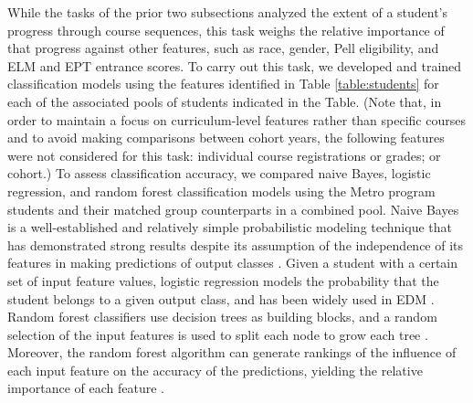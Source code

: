 \documentclass[conference]{IEEEtran}
\begin{document}
While the tasks of the prior two subsections analyzed the extent of a student's progress through course sequences, this task weighs the relative importance of that progress against other features, such as race, gender, Pell eligibility, and ELM and EPT entrance scores.  To carry out this task, we developed and trained classification models using the features identified in Table \ref{table:students} for each of the associated pools of students indicated in the Table.  (Note that, in order to maintain a focus on curriculum-level features rather than specific courses and to avoid making comparisons between cohort years, the following features were not considered for this task: individual course registrations or grades; or cohort.)  To assess classification accuracy, we compared naive Bayes, logistic regression, and random forest classification models using the Metro program students and their matched group counterparts in a combined pool.  Naive Bayes is a well-established and relatively simple probabilistic modeling technique that has demonstrated strong results despite its assumption of the independence of its features in making predictions of output classes \cite{Rish}.  Given a student with a certain set of input feature values, logistic regression models the probability that the student belongs to a given output class, and has been widely used in EDM \cite{Hastie, Romero_2010}.  Random forest classifiers use decision trees as building blocks, and a random selection of the input features is used to split each node to grow each tree \cite{Breiman}.  Moreover, the random forest algorithm can generate rankings of the influence of each input feature on the accuracy of the predictions, yielding the relative importance of each feature \cite{Hastie, Louppe}.  %
\end{document}
